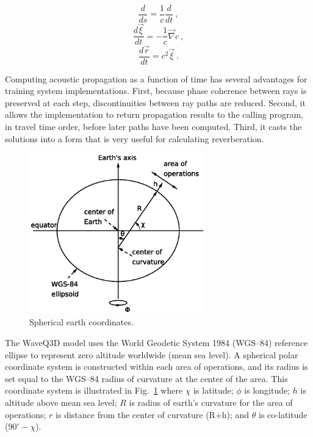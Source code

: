 \documentclass{ws-jca}
\begin{document}
\begin{equation}
	\frac{d}{ds} = \frac{1}{c} \frac{d}{dt} \:, 
	\label{eq:d_ds}
\end{equation}
\begin{equation}
	\frac{d\vec{\xi}}{dt} = -\frac{1}{c} \vec{\nabla}c \:,
	\label{eq:dxivec_dt}
\end{equation}
\begin{equation}
	\frac{d\vec{r}}{dt} = c^2 \vec{\xi} \:.
	\label{eq:drvec_dt}
\end{equation}

Computing acoustic propagation as a function of time has several advantages for training system implementations.  First, because phase coherence between rays is preserved at each step, discontinuities between ray paths are reduced.  Second, it allows the implementation to return propagation results to the calling program, in travel time order, before later paths have been computed.  Third, it casts the solutions into a form that is very useful for calculating reverberation.

\begin{figure}[th]
	\centerline{\includegraphics[width=3in]{SphericalEarthCoordinates.eps}} 
	\vspace*{8pt}
	\caption{Spherical earth coordinates.}
	\label{fig:earth}
\end{figure}
The WaveQ3D model uses the World Geodetic System 1984 (WGS--84)\cite{WGS84} reference ellipse to represent zero altitude worldwide (mean sea level). A
spherical polar coordinate system is constructed within each area of
operations, and its radius is set equal to the WGS--84 radius of curvature
at the center of the area. This coordinate system is illustrated in
Fig.~\ref{fig:earth} 
where 
\(\chi\) is latitude;
\(\phi\) is longitude; 
$h$ is altitude above mean sea level;
$R$ is radius of earth's curvature for the area of operations;
$r$ is distance from the center of curvature (R+h); and 
\(\theta\) is co-latitude (\(90^\circ-\chi\)).
\end{document}
